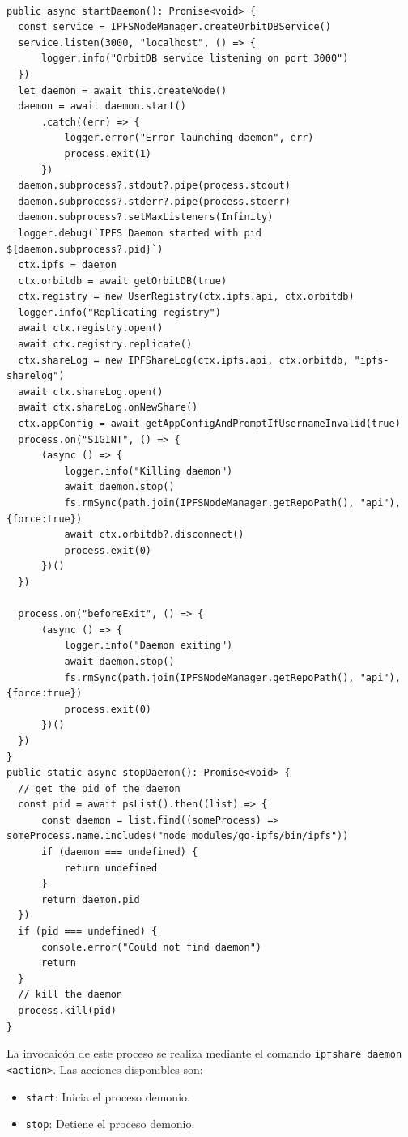 \begin{verbatim}

public async startDaemon(): Promise<void> {
  const service = IPFSNodeManager.createOrbitDBService()
  service.listen(3000, "localhost", () => { 
      logger.info("OrbitDB service listening on port 3000")
  })
  let daemon = await this.createNode()
  daemon = await daemon.start()
      .catch((err) => { 
          logger.error("Error launching daemon", err) 
          process.exit(1)
      })
  daemon.subprocess?.stdout?.pipe(process.stdout)
  daemon.subprocess?.stderr?.pipe(process.stderr)
  daemon.subprocess?.setMaxListeners(Infinity)
  logger.debug(`IPFS Daemon started with pid ${daemon.subprocess?.pid}`)
  ctx.ipfs = daemon
  ctx.orbitdb = await getOrbitDB(true)
  ctx.registry = new UserRegistry(ctx.ipfs.api, ctx.orbitdb)
  logger.info("Replicating registry")
  await ctx.registry.open()
  await ctx.registry.replicate()
  ctx.shareLog = new IPFShareLog(ctx.ipfs.api, ctx.orbitdb, "ipfs-sharelog")
  await ctx.shareLog.open()
  await ctx.shareLog.onNewShare()
  ctx.appConfig = await getAppConfigAndPromptIfUsernameInvalid(true)
  process.on("SIGINT", () => {
      (async () => {
          logger.info("Killing daemon")
          await daemon.stop()
          fs.rmSync(path.join(IPFSNodeManager.getRepoPath(), "api"), {force:true})
          await ctx.orbitdb?.disconnect()
          process.exit(0)
      })()
  })

  process.on("beforeExit", () => {
      (async () => {
          logger.info("Daemon exiting")
          await daemon.stop()
          fs.rmSync(path.join(IPFSNodeManager.getRepoPath(), "api"), {force:true})
          process.exit(0)
      })()
  })
}
public static async stopDaemon(): Promise<void> {
  // get the pid of the daemon
  const pid = await psList().then((list) => {
      const daemon = list.find((someProcess) => someProcess.name.includes("node_modules/go-ipfs/bin/ipfs"))
      if (daemon === undefined) {
          return undefined 
      }
      return daemon.pid
  })
  if (pid === undefined) {
      console.error("Could not find daemon")
      return
  }
  // kill the daemon
  process.kill(pid)
}  
\end{verbatim}

La invocaicón de este proceso se realiza mediante el comando \texttt{ipfshare daemon <action>}. Las acciones disponibles son:
\begin{itemize}[noitemsep,after=\vspace{-0.4\baselineskip}]
  \item \texttt{start}: Inicia el proceso demonio.
  \item \texttt{stop}: Detiene el proceso demonio.
\end{itemize}

